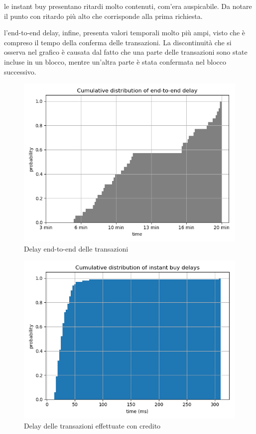 le instant buy presentano ritardi molto contenuti, com'era auspicabile. Da notare il punto con ritardo più alto che corrisponde alla prima richiesta.

l'end-to-end delay, infine, presenta valori temporali molto più ampi, visto che è compreso il tempo della conferma delle transazioni. La discontinuità che si osserva nel grafico è causata dal fatto che una parte delle transazioni sono state incluse in un blocco, mentre un'altra parte è stata confermata nel blocco successivo.

\begin{figure}[h!t]
\centerline{\includegraphics[width=\textwidth]{img/end-to-endGIUSTO}}
\caption{Delay end-to-end delle transazioni}
\label{f:calcoli:end2end}
\end{figure}

\begin{figure}[h!t]
\centerline{\includegraphics[width=\textwidth]{img/instant-buy-delay}}
\caption{Delay delle transazioni effettuate con credito}
\label{f:calcoli:instant}
\end{figure}

